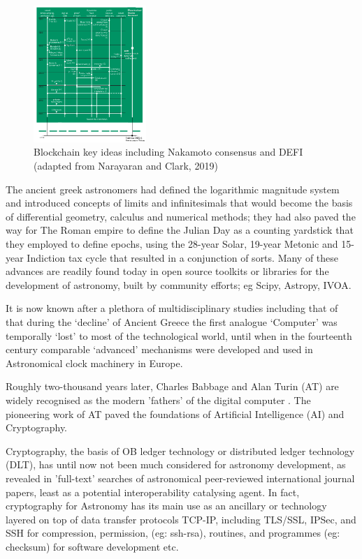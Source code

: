 \documentclass[final,5p,times,twocolumn,authoryear]{elsarticle}
\begin{document}
 \begin{figure}
    \centering
    \includegraphics[width=0.38\textwidth]{narayanan3.png}
    \vspace*{-0.3cm}
    \caption{Blockchain key ideas including Nakamoto consensus and DEFI (adapted from Narayaran and Clark, 2019)}
    \label{fig:narayanan}
\end{figure}
 
 The ancient greek astronomers had defined the logarithmic magnitude system and introduced concepts of limits and infinitesimals that would become the basis of differential geometry, calculus and numerical methods; they had also paved the way for The Roman empire to define the Julian Day as a counting yardstick that they employed to define epochs, using the 28-year Solar, 19-year Metonic and 15-year Indiction tax cycle that resulted in a conjunction of sorts. Many of these advances are readily found today in open source toolkits or libraries for the development of astronomy, built by community efforts; eg Scipy, Astropy, IVOA. 
 
 It is now known after a plethora of multidisciplinary studies including that of \cite{Freeth2021} that during the `decline' of Ancient Greece the first analogue `Computer' was temporally `lost' to most of the technological world, until when in the fourteenth century comparable `advanced' mechanisms were developed and used in Astronomical clock machinery in Europe. 
 
 Roughly two-thousand years later, Charles Babbage and Alan Turin (AT) are widely recognised as the modern 'fathers' of the digital computer \citep{swa2017}. The pioneering work of AT paved the foundations of Artificial Intelligence (AI) and Cryptography. 
 
Cryptography, the basis of OB ledger technology or distributed ledger technology (DLT), has until now not been much considered for astronomy development, as revealed in 'full-text' searches of astronomical peer-reviewed international journal papers, least as a potential interoperability catalysing agent. In fact, cryptography for Astronomy has its main use as an ancillary or technology layered on top of data transfer protocols TCP-IP, including TLS/SSL, IPSec, and SSH for compression, permission, (eg: ssh-rsa), routines, and programmes (eg: checksum) for software development etc.
\end{document}

